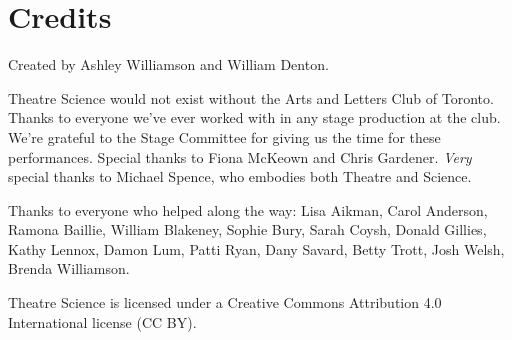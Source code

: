\newpage

\section{Credits}

Created by Ashley Williamson and William Denton.

Theatre Science would not exist without the Arts and Letters Club of Toronto.  Thanks to everyone we've ever worked with in any stage production at the club.  We're grateful to the Stage Committee for giving us the time for these performances.  Special thanks to Fiona McKeown and Chris Gardener.  \textit{Very} special thanks to Michael Spence, who embodies both Theatre and Science.

Thanks to everyone who helped along the way:  Lisa Aikman, Carol Anderson, Ramona Baillie, William Blakeney, Sophie Bury, Sarah Coysh, Donald Gillies, Kathy Lennox, Damon Lum, Patti Ryan, Dany Savard, Betty Trott, Josh Welsh, Brenda Williamson.

Theatre Science is licensed under a Creative Commons Attribution 4.0 International license (CC BY).  %
